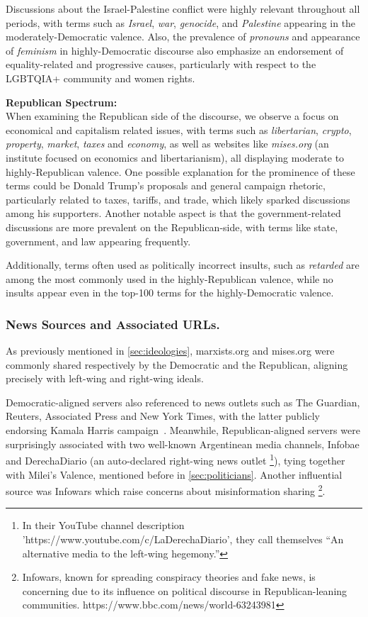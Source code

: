 Discussions about the Israel-Palestine conflict were highly relevant throughout all periods, with terms such as \textit{Israel}, \textit{war}, \textit{genocide}, and \textit{Palestine} appearing in the moderately-Democratic valence. Also, the prevalence of \textit{pronouns} and appearance of \textit{feminism} in highly-Democratic discourse also emphasize an endorsement of equality-related and progressive causes, particularly with respect to the LGBTQIA+ community and women rights.

\textbf{Republican Spectrum:\\}    When examining the Republican side of the discourse, we observe a focus on economical and capitalism related issues, with terms such as \textit{libertarian}, \textit{crypto}, \textit{property}, \textit{market}, \textit{taxes} and \textit{economy}, as well as websites like \textit{mises.org} (an institute focused on economics and libertarianism),  all displaying moderate to highly-Republican valence. One  possible explanation for the prominence of these terms could be  Donald Trump's proposals and general campaign rhetoric, particularly related to taxes, tariffs, and trade, which likely sparked discussions among his supporters. Another notable aspect is that the government-related discussions are more prevalent on the Republican-side, with terms like state, government, and law appearing frequently. 

Additionally,  terms often used as politically incorrect insults, such as \textit{retarded} are among the most commonly used  in the highly-Republican valence, while no insults appear even in the top-100 terms for the highly-Democratic valence.


\subsubsection{News Sources and Associated URLs. \\}
\label{sec:news}

As previously mentioned in \ref{sec:ideologies}, marxists.org and mises.org were commonly shared respectively by the Democratic and the Republican, aligning precisely with left-wing and right-wing ideals.

Democratic-aligned servers also referenced to news outlets such as The Guardian, Reuters, Associated Press and New York Times, with the latter publicly endorsing Kamala Harris campaign~\cite{nyt2024stance}. Meanwhile, Republican-aligned servers were surprisingly associated with two well-known Argentinean media channels, Infobae and DerechaDiario (an auto-declared right-wing news outlet \footnote{In their YouTube channel description 'https://www.youtube.com/c/LaDerechaDiario', they call themselves ``An alternative media to the left-wing hegemony.''}), tying together with Milei's Valence, mentioned before in \ref{sec:politicians}. Another influential source was Infowars which raise concerns about misinformation sharing \footnote{Infowars, known for spreading conspiracy theories and fake news, is concerning due to its influence on political discourse in Republican-leaning communities. https://www.bbc.com/news/world-63243981}. 

